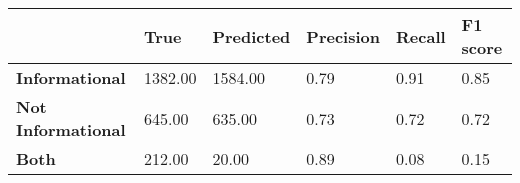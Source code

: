 \begin{tabular}{|l|l|l|l|l|l|}
\hline
&\textbf{True}&\textbf{Predicted}&\textbf{Precision}&\textbf{Recall}&\textbf{F1 score}\\\hline
\textbf{Informational}&1382.00&1584.00&0.79&0.91&0.85\\\hline
\textbf{Not Informational}&645.00&635.00&0.73&0.72&0.72\\\hline
\textbf{Both}&212.00&20.00&0.89&0.08&0.15\\\hline
\end{tabular}
